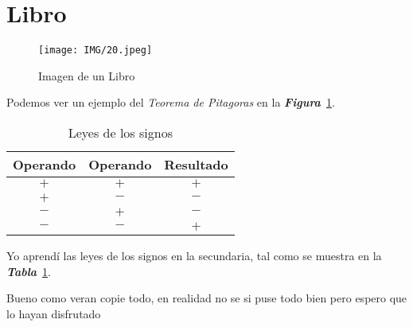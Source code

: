 \section{Libro}
\begin{figure}[h]
  \centering
  \texttt{[image: IMG/20.jpeg]}
  \caption{Imagen de un Libro}
  \label{fig:Libro}
\end{figure}

Podemos ver un ejemplo del \emph{Teorema de Pitagoras} en la
\emph{\textbf{Figura}}~\ref{fig:Libro}.


\begin{table}[h]
  \centering
  \begin{tabular}{| c  c  c  |}
    \hline
    Operando & Operando & Resultado\\\hline
    $+$ & $+$ & $+$\\\hline
    $+$ & $-$ & $-$\\\hline
    $-$ & $+$ & $-$\\\hline
    $-$ & $-$ & $+$\\\hline    
  \end{tabular}
  \caption{Leyes de los signos}
  \label{tabla:leyes_signos}
\end{table}

Yo aprendí las leyes de los signos en la secundaria, tal como
se muestra en la \textbf{\emph{Tabla}}~\ref{tabla:leyes_signos}.

Bueno como veran copie todo, en realidad no se si puse todo bien pero espero que lo hayan disfrutado
